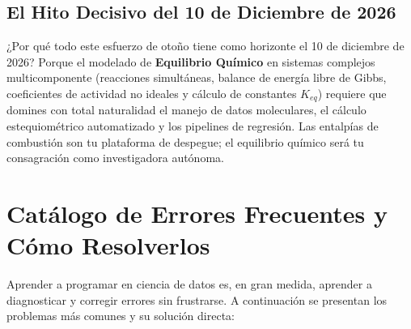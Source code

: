 \documentclass[11pt,letterpaper]{report}
\begin{document}
\section{El Hito Decisivo del 10 de Diciembre de 2026}
¿Por qué todo este esfuerzo de otoño tiene como horizonte el 10 de diciembre de 2026? Porque el modelado de \textbf{Equilibrio Químico} en sistemas complejos multicomponente (reacciones simultáneas, balance de energía libre de Gibbs, coeficientes de actividad no ideales y cálculo de constantes $K_{eq}$) requiere que domines con total naturalidad el manejo de datos moleculares, el cálculo estequiométrico automatizado y los pipelines de regresión. Las entalpías de combustión son tu plataforma de despegue; el equilibrio químico será tu consagración como investigadora autónoma.

\newpage

\chapter{Catálogo de Errores Frecuentes y Cómo Resolverlos}

Aprender a programar en ciencia de datos es, en gran medida, aprender a diagnosticar y corregir errores sin frustrarse. A continuación se presentan los problemas más comunes y su solución directa:
\end{document}
